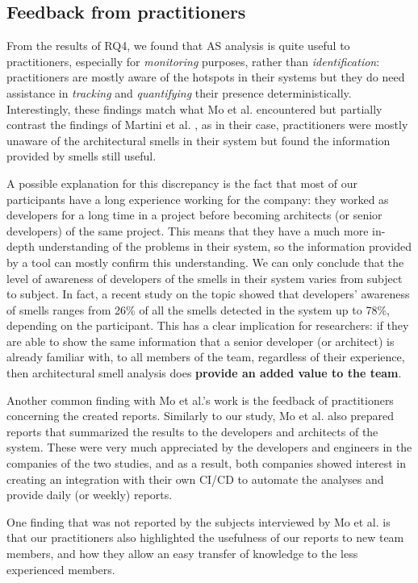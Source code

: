 \subsection{Feedback from practitioners}
From the results of RQ4, we found that AS analysis is quite useful to practitioners, especially for \emph{monitoring} purposes, rather than \emph{identification}: practitioners are mostly aware of the hotspots in their systems but they do need assistance in \emph{tracking} and \emph{quantifying} their presence deterministically.
Interestingly, these findings match what Mo et al. \cite{Mo2018} encountered but partially contrast the findings of Martini et al. \cite{Martini2018}, as in their case, practitioners were mostly unaware of the architectural smells in their system but found the information provided by smells still useful.

A possible explanation for this discrepancy is the fact that most of our participants have a long experience working for the company: they worked as developers for a long time in a project before becoming architects (or senior developers) of the same project. This means that they have a much more in-depth understanding of the problems in their system, so the information provided by a tool can mostly confirm this understanding.
We can only conclude that the level of awareness of developers of the smells in their system varies from subject to subject. In fact, a recent study on the topic \cite{Arcelli2020} showed that developers' awareness of smells ranges from 26\% of all the smells detected in the system up to 78\%, depending on the participant.
This has a clear implication for researchers: if they are able to show the same information that a senior developer (or architect) is already familiar with, to all members of the team, regardless of their experience, then architectural smell analysis does \textbf{provide an added value to the team}.

Another common finding with Mo et al.'s work \cite{Mo2018} is the feedback of practitioners concerning the created reports.
Similarly to our study, Mo et al. also prepared reports that summarized the results to the developers and architects of the system.
These were very much appreciated by the developers and engineers in the companies of the two studies, and as a result, both companies showed interest in creating an integration with their own CI/CD to automate the analyses and provide daily (or weekly) reports.

One finding that was not reported by the subjects interviewed by Mo et al. is that our practitioners also highlighted the usefulness of our reports to new team members, and how they allow an easy transfer of knowledge to the less experienced members.

